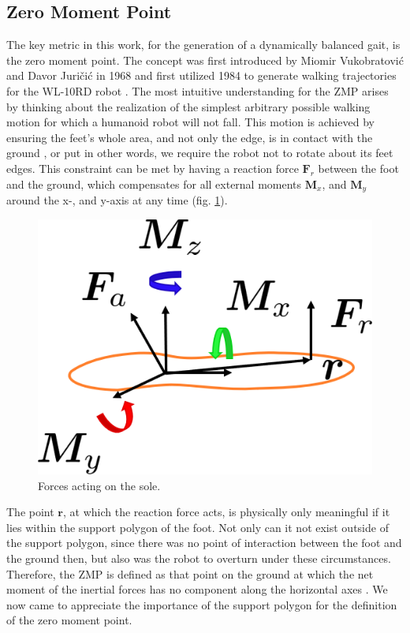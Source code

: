 \subsection{Zero Moment Point}
\label{sec::311_zmp}
The key metric in this work, for the generation of a dynamically balanced gait, is the zero moment point. The concept was first introduced by Miomir Vukobratovi\'{c} and Davor Juri\v{c}i\'{c} in 1968 \cite{vukobratovic1968contribution}\cite{vukobratovic1969contribution} and first utilized 1984 to generate walking trajectories for the WL-10RD robot \cite{yamaguchi1993development}. The most intuitive understanding for the ZMP arises by thinking about the realization of the simplest arbitrary possible walking motion for which a humanoid robot will not fall. This motion is achieved by ensuring the feet's whole area, and not only the edge, is in contact with the ground \cite{vukobratovic2004zero}, or put in other words, we require the robot not to rotate about its feet edges. This constraint can be met by having a reaction force $\bm{F}_r$ between the foot and the ground, which compensates for all external moments $\bm{M}_x$, and $\bm{M}_y$ around the x-, and y-axis at any time (fig. \ref{fig::311_zmp}).
\begin{figure}[h]
	\centering
	\includegraphics[scale=.5]{chapters/03_background/img/zero_moment_point.png}
	\caption{Forces acting on the sole.}
	\label{fig::311_zmp}
\end{figure}
The point $\bm{r}$, at which the reaction force acts, is physically only meaningful if it lies within the support polygon of the foot. Not only can it not exist outside of the support polygon, since there was no point of interaction between the foot and the ground then, but also was the robot to overturn under these circumstances. Therefore, the ZMP is defined as that point on the ground at which the net moment of the inertial forces has no component along the horizontal axes \cite{hirai1998development}\cite{dasgupta1999making}. We now came to appreciate the importance of the support polygon for the definition of the zero moment point. 
